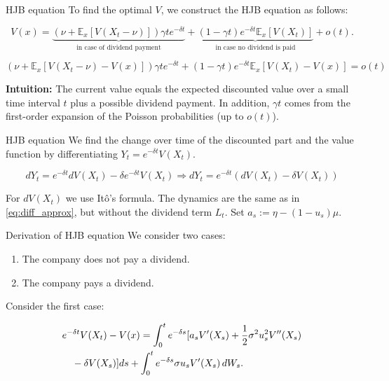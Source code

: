 \documentclass{beamer}
\theoremstyle{definition}
\newcommand{\E}{\mathbb{E}}
\begin{document}
\begin{frame}{HJB equation}
To find the optimal \(V\), we construct the HJB equation as follows:

\begin{equation}
    V(x) = \underbrace{(\nu + \E_{x}[V(X_{t} - \nu)]) \gamma t e^{-\delta t}}_{\text{in case of dividend payment}} + \underbrace{(1 - \gamma t) e^{-\delta t} \E_{x}[V(X_{t})]}_{\text{in case no dividend is paid}} + o(t).
    \label{eq:HJB_const}
\end{equation}

\[
(\nu + \E_{x}[V(X_{t} - \nu) - V(x)]) \gamma t e^{-\delta t} + (1 - \gamma t) e^{-\delta t} \E_{x}[V(X_{t}) - V(x)] = o(t)
\]

\noindent
\textbf{Intuition:} The current value equals the expected discounted value over a small time interval $t$ plus a possible dividend payment. In addition, \(\gamma t\) comes from the first-order expansion of the Poisson probabilities (up to \(o(t)\)).

\end{frame}

\begin{frame}{HJB equation}
We find the change over time of the discounted part and the value function by differentiating \(Y_t = e^{-\delta t}V(X_t)\).

\begin{equation}
    dY_t = e^{-\delta t}dV(X_t) - \delta e^{-\delta t} V(X_t) \Rightarrow{} dY_t = e^{- \delta t} (dV(X_t) - \delta V(X_t))
    \label{eq:diff_of_Y_t}
\end{equation}

For \(dV(X_t)\) we use It\^{o}'s formula. The dynamics are the same as in \eqref{eq:diff_approx}, but without the dividend term \(L_t\). Set \(a_s := \eta - (1-u_s)\mu\).
    
\end{frame}

\begin{frame}{Derivation of HJB equation}
We consider two cases:

\begin{enumerate}
    \item The company does not pay a dividend.
    \item The company pays a dividend.
\end{enumerate}

Consider the first case:

\begin{align}
    &e^{-\delta t}V(X_t) - V(x) = \int_0^t e^{-\delta s}
        [a_s V'(X_s)
        + \frac{1}{2}\sigma^2 u_s^2 V''(X_s) \notag \\
    & \quad - \delta V(X_s)]ds 
     + \int_0^t e^{-\delta s} \sigma u_s V'(X_s)\, dW_s.
    \label{eq:first_case_1}
\end{align}
    
\end{frame}
\end{document}
